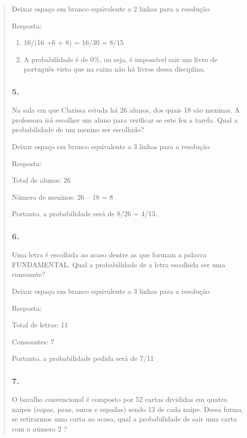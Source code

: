 \begin{enumerate}
\begin{escolha}
\begin{enumerate}
\begin{itemize}
\begin{itemize}
\begin{escolha}
\begin{quote}
\begin{escolha}
Deixar espaço em branco equivalente a 2 linhas para a resolução

Resposta:

\begin{enumerate}
\def\labelenumi{\alph{enumi})}
\item
  16/(16 +6 + 8) = 16/30 = 8/15
\item
  A probabilidade é de 0\%, ou seja, é impossível sair um livro de
  português visto que na caixa não há livros dessa disciplina.
\end{enumerate}

\subsubsection{5.}\label{section-82}

Na sala em que Clarissa estuda há 26 alunos, dos quais 18 são meninas. A
professora irá escolher um aluno para verificar se este fez a tarefa.
Qual a probabilidade de um menino ser escolhido?

Deixar espaço em branco equivalente a 3 linhas para a resolução

Resposta:

Total de alunos: 26

Número de meninos: 26 -- 18 = 8

Portanto, a probabilidade será de 8/26 = 4/13.

\subsubsection{6.}\label{section-83}

Uma letra é escolhida ao acaso dentre as que formam a palavra
FUNDAMENTAL. Qual a probabilidade de a letra escolhida ser uma
consoante?

Deixar espaço em branco equivalente a 3 linhas para a resolução

Resposta:

Total de letras: 11

Consoantes: 7

Portanto, a probabilidade pedida será de 7/11

\subsubsection{7.}\label{section-84}

O baralho convencional é composto por 52 cartas divididas em quatro
naipes (copas, paus, ouros e espadas) sendo 13 de cada naipe. Dessa
forma, se retirarmos uma carta ao acaso, qual a probabilidade de sair
uma carta com o número 2 ?


\end{escolha}
\end{quote}
\end{escolha}
\end{itemize}
\end{itemize}
\end{enumerate}
\end{escolha}
\end{enumerate}
